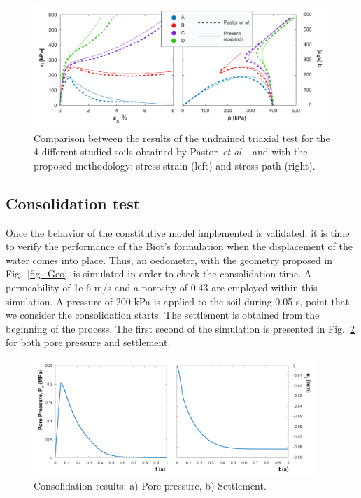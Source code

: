 \documentclass[preprint,12pt,a4paper]{elsarticle}
\begin{document}
\begin{figure}
\centering
\includegraphics[width=0.99\textwidth]{Figs/undrained.pdf}
\caption{Comparison between the results of the undrained triaxial test for the 4 different studied soils obtained by Pastor~\textit{et al.}~\cite{PastorZC:90} and with the proposed methodology: stress-strain (left) and stress path (right).}
\label{fig_undrained}
\end{figure}


\subsection{Consolidation test}
\label{sec:42}
Once the behavior of the constitutive model implemented is validated, it is time to verify the performance of the Biot's formulation when the displacement of the water comes into place. Thus, an oedometer, with the geometry proposed in Fig.~\ref{fig_Geo}, is simulated in order to check the consolidation time. A permeability of 1e-6 m/s and a porosity of 0.43 are employed within this simulation. A pressure of 200 kPa is applied to the soil during 0.05 s, point that we consider the consolidation starts. The settlement is obtained from the beginning of the process. The first second of the simulation is presented in Fig.~\ref{fig_conso} for both pore pressure and settlement.


\begin{figure}
\centering
\includegraphics[width=0.95\textwidth]{Figs/conso.pdf}
\caption{Consolidation results: a) Pore pressure, b) Settlement.}
\label{fig_conso}
\end{figure}
\end{document}
